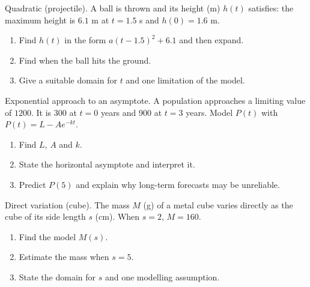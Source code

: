 \documentclass[11pt]{article}
\def\textbf#1{#1}%
\newcounter{question}
\begin{document}
\begin{question}
\textbf{Quadratic (projectile).}
A ball is thrown and its height (m) $h(t)$ satisfies: the maximum height is $6.1$ m at $t=1.5$ s and $h(0)=1.6$ m.
\begin{enumerate}
  \item Find $h(t)$ in the form $a(t-1.5)^2+6.1$ and then expand.
  \item Find when the ball hits the ground.
  \item Give a suitable domain for $t$ and one limitation of the model.
\end{enumerate}

\begin{center}
\end{center}
\end{question}

\begin{question}
\textbf{Exponential approach to an asymptote.}
A population approaches a limiting value of $1200$. It is $300$ at $t=0$ years and $900$ at $t=3$ years.
Model $P(t)$ with $P(t)=L-Ae^{-kt}$.
\begin{enumerate}
  \item Find $L$, $A$ and $k$.
  \item State the horizontal asymptote and interpret it.
  \item Predict $P(5)$ and explain why long-term forecasts may be unreliable.
\end{enumerate}
\end{question}

\begin{question}
\textbf{Direct variation (cube).}
The mass $M$ (g) of a metal cube varies directly as the cube of its side length $s$ (cm). When $s=2$, $M=160$.
\begin{enumerate}
  \item Find the model $M(s)$.
  \item Estimate the mass when $s=5$.
  \item State the domain for $s$ and one modelling assumption.
\end{enumerate}
\end{question}
\end{document}

